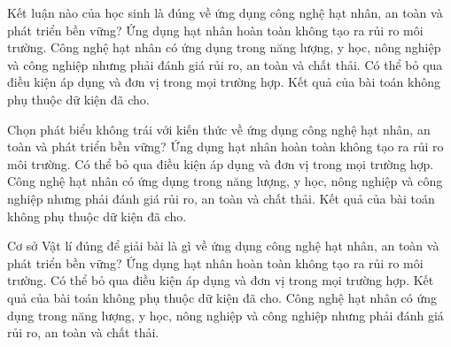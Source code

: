 \begin{ex}
Kết luận nào của học sinh là đúng về ứng dụng công nghệ hạt nhân, an toàn và phát triển bền vững?
\choice
{Ứng dụng hạt nhân hoàn toàn không tạo ra rủi ro môi trường.}
{\True Công nghệ hạt nhân có ứng dụng trong năng lượng, y học, nông nghiệp và công nghiệp nhưng phải đánh giá rủi ro, an toàn và chất thải.}
{Có thể bỏ qua điều kiện áp dụng và đơn vị trong mọi trường hợp.}
{Kết quả của bài toán không phụ thuộc dữ kiện đã cho.}
\end{ex}

\begin{ex}
Chọn phát biểu không trái với kiến thức về ứng dụng công nghệ hạt nhân, an toàn và phát triển bền vững?
\choice
{Ứng dụng hạt nhân hoàn toàn không tạo ra rủi ro môi trường.}
{Có thể bỏ qua điều kiện áp dụng và đơn vị trong mọi trường hợp.}
{\True Công nghệ hạt nhân có ứng dụng trong năng lượng, y học, nông nghiệp và công nghiệp nhưng phải đánh giá rủi ro, an toàn và chất thải.}
{Kết quả của bài toán không phụ thuộc dữ kiện đã cho.}
\end{ex}

\begin{ex}
Cơ sở Vật lí đúng để giải bài là gì về ứng dụng công nghệ hạt nhân, an toàn và phát triển bền vững?
\choice
{Ứng dụng hạt nhân hoàn toàn không tạo ra rủi ro môi trường.}
{Có thể bỏ qua điều kiện áp dụng và đơn vị trong mọi trường hợp.}
{Kết quả của bài toán không phụ thuộc dữ kiện đã cho.}
{\True Công nghệ hạt nhân có ứng dụng trong năng lượng, y học, nông nghiệp và công nghiệp nhưng phải đánh giá rủi ro, an toàn và chất thải.}
\end{ex}

